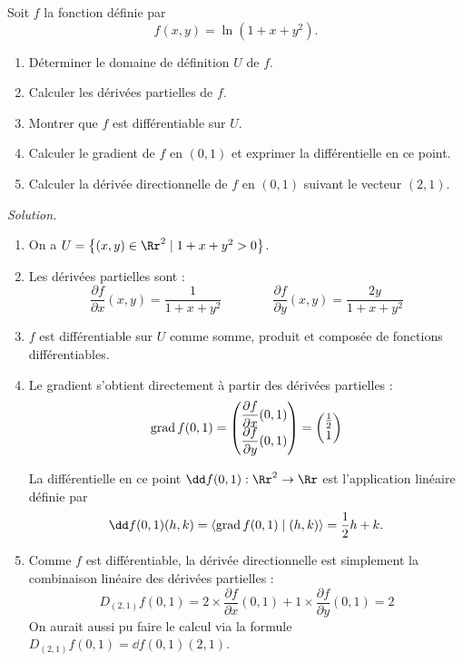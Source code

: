 \documentclass[11pt, class=report,crop=false]{standalone}
\begin{document}
\begin{exemple}
Soit $f$ la fonction définie par 
$$f(x,y) =  \ln(1+x+y^2).$$

\begin{enumerate}
  \item Déterminer le domaine de définition $U$ de $f$.
  \item Calculer les dérivées partielles de $f$.
  \item Montrer que $f$ est différentiable sur $U$.
  \item Calculer le gradient de $f$ en $(0,1)$ et exprimer la différentielle en ce point.
  \item Calculer la dérivée directionnelle de $f$ en $(0,1)$ suivant le vecteur $(2,1)$.
\end{enumerate}
 
\bigskip
\emph{Solution.}





\begin{enumerate}
  \item On a $U = \big\{ (x,y) \in \Rr^2 \mid 1+x+y^2>0 \big\}$.


  \item Les dérivées partielles sont :
  $$\frac{\partial f}{\partial x}(x,y) = \frac{1}{1+x+y^2} \qquad\qquad
  \frac{\partial f}{\partial y}(x,y) = \frac{2y}{1+x+y^2}$$
  
  
  \item $f$ est différentiable sur $U$ comme somme, produit et composée de fonctions différentiables.
  
  \item Le gradient s'obtient directement à partir des dérivées partielles :
  $$\operatorname{grad} f (0,1) = \begin{pmatrix} \dfrac{\partial f}{\partial x}(0,1) \\\dfrac{\partial f}{\partial y}(0,1) \end{pmatrix} = 
\begin{pmatrix} \frac12 \\ 1 \end{pmatrix}$$

  La différentielle en ce point $\dd f(0,1) : \Rr^2 \to \Rr$ est l'application linéaire définie par 
  $$\dd f(0,1)(h,k) = \langle \grad f (0,1) \mid (h,k) \rangle = \frac12h +k.$$
  
  \item Comme $f$ est différentiable, la dérivée directionnelle est simplement la combinaison linéaire des dérivées partielles :
  $$D_{(2,1)} f(0,1) = 2\times \frac{\partial f}{\partial x}(0,1)+1\times
  \frac{\partial f}{\partial y}(0,1) = 2$$
  On aurait aussi pu faire le calcul via la formule $D_{(2,1)} f(0,1) = \dd f(0,1)(2,1)$.
\end{enumerate} 
  
\end{exemple}
\end{document}
